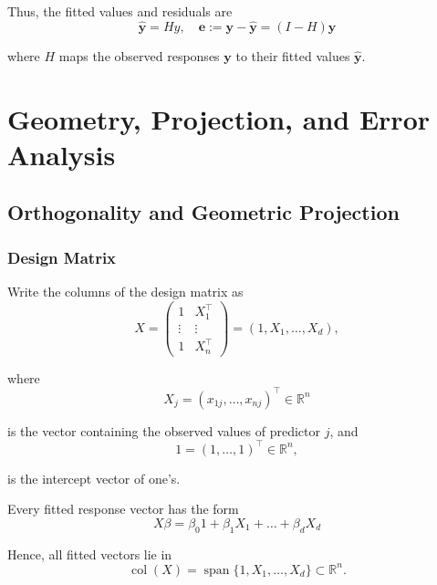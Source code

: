 Thus, the fitted values and residuals are
\begin{equation*}
    \hat{\bm{y}}=Hy, \quad \bm{e}:=\bm{y}-\hat{\bm{y}}=(I-H)\bm{y}
\end{equation*}

where $H$ maps the observed responses $\bm{y}$ to their fitted values $\hat{\bm{y}}$.


\section{Geometry, Projection, and Error Analysis}

\subsection{Orthogonality and Geometric Projection}

\subsubsection{Design Matrix}

Write the columns of the design matrix as
\begin{equation*}
    X = \begin{pmatrix}
        1 & X_1^\top \\
        \vdots & \vdots \\
        1 & X_n^\top
    \end{pmatrix} = (1, X_1, \dots, X_d),
\end{equation*}

where
\begin{equation*}
    X_j = (x_{1j}, \dots, x_{nj})^\top \in \mathbb{R}^n
\end{equation*}

is the vector containing the observed values of predictor $j$, and
\begin{equation*}
    1 = (1, \dots, 1)^\top \in \mathbb{R}^n,
\end{equation*}

is the intercept vector of one's.

\vspace{0.5em}
\noindent
Every fitted response vector has the form
\begin{equation*}
    X\beta = \beta_0 1 + \beta_1 X_1 + \dots + \beta_d X_d
\end{equation*}

Hence, all fitted vectors lie in
\begin{equation*}
    \operatorname{col}(X) = \operatorname{span}\{1, X_1, \dots, X_d\} \subset \mathbb{R}^n.
\end{equation*}

